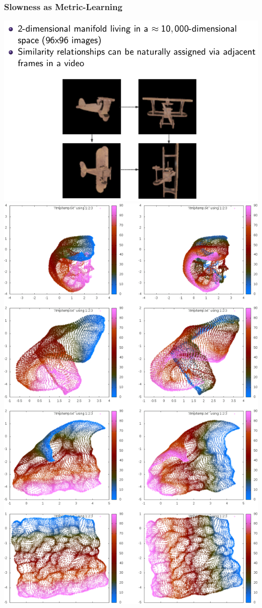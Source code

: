 \documentclass{beamer}
\begin{document}
\begin{frame} 
\frametitle{Slowness as Metric-Learning} 
\begin{center}
\includegraphics[scale=0.2]{./figures/drlim_data.png}
\includegraphics[scale=0.2]{./figures/drlim.png}
\end{center}
\end{frame} 
\end{document}
